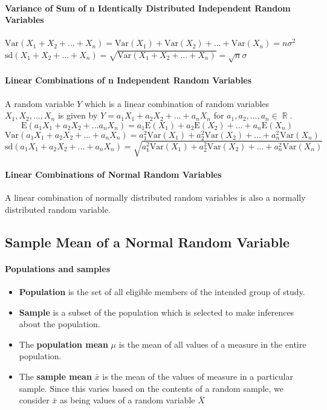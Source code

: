 \documentclass[a4paper,twoside]{article}
\DeclareMathOperator\R{\mathbb{R}}
\begin{document}
			\paragraph{Variance of Sum of n Identically Distributed Independent Random Variables} $\displaystyle\mathrm{Var}(X_1+X_2+...+X_n)=\mathrm{Var}(X_1)+\mathrm{Var}(X_2)+...+\mathrm{Var}(X_n)=n\sigma^2$\\
			$\displaystyle\mathrm{sd}(X_1+X_2+...+X_n)=\sqrt{\mathrm{Var}(X_1+X_2+...+X_n)}=\sqrt{n}\sigma$
			
			\paragraph{Linear Combinations of n Independent Random Variables} A random variable $Y$ which is a linear combination of random variables $X_1,X_2,...,X_n$ is given by $Y=a_1X_1+a_2X_2+...+a_nX_n$ for $a_1,a_2,...,a_n\in\R$.
			\[
				\mathrm{E}(a_1X_1+a_2X_2+...a_nX_n)=a_1\mathrm{E}(X_1)+a_2\mathrm{E}(X_2)+...+a_n\mathrm{E}(X_n)
			\]
			\[
				\mathrm{Var}(a_1X_1+a_2X_2+...+a_nX_n)=a_1^2\mathrm{Var}(X_1)+a_2^2\mathrm{Var}(X_2)+...+a_n^2\mathrm{Var}(X_n)
			\]
			\[
				\mathrm{sd}(a_1X_1+a_2X_2+...+a_nX_n)=\sqrt{a_1^2\mathrm{Var}(X_1)+a_2^2\mathrm{Var}(X_2)+...+a_n^2\mathrm{Var}(X_n)}
			\]
		
			\paragraph{Linear Combinations of Normal Random Variables} A linear combination of normally distributed random variables is also a normally distributed random variable.
		\subsection{Sample Mean of a Normal Random Variable}
			\paragraph{Populations and samples}
				\begin{itemize}
					\item \textbf{Population} is the set of all eligible members of the intended group of study.
					\item \textbf{Sample} is a subset of the population which is selected to make inferences about the population.
					\item The \textbf{population mean} $\mu$ is the mean of all values of a measure in the entire population.
					\item The \textbf{sample mean} $\bar{x}$ is the mean of the values of measure in a particular sample. Since this varies based on the contents of a random sample, we consider $\bar{x}$ as being values of a random variable $\bar{X}$
				\end{itemize}
			
\end{document}
